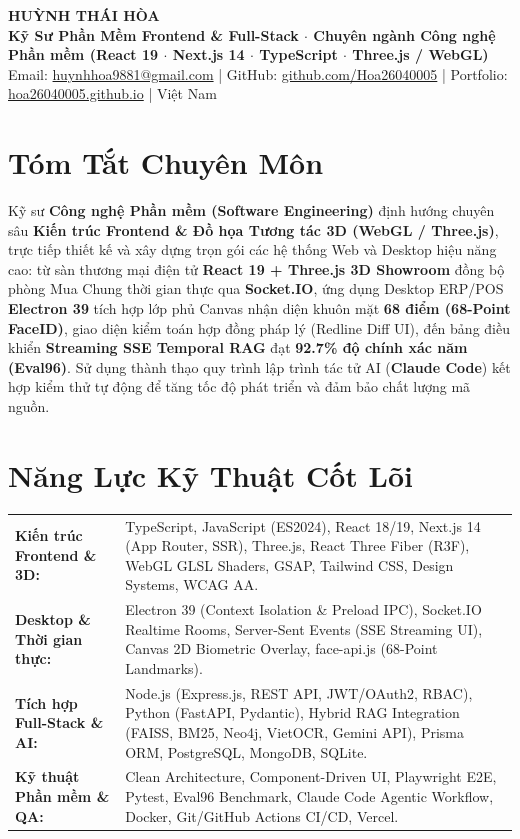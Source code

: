 \documentclass[10pt,a4paper]{article}
\begin{document}
\begin{center}
  {\Large \textbf{HUỲNH THÁI HÒA}} \\[2pt]
  {\small \textbf{Kỹ Sư Phần Mềm Frontend \& Full-Stack $\cdot$ Chuyên ngành Công nghệ Phần mềm (React 19 $\cdot$ Next.js 14 $\cdot$ TypeScript $\cdot$ Three.js / WebGL)}} \\[2pt]
  {\footnotesize
    Email: \href{mailto:huynhhoa9881@gmail.com}{huynhhoa9881@gmail.com} \quad|\quad
    GitHub: \href{https://github.com/Hoa26040005}{github.com/Hoa26040005} \quad|\quad
    Portfolio: \href{https://hoa26040005.github.io}{hoa26040005.github.io} \quad|\quad
    Việt Nam
  }
\end{center}

\section{Tóm Tắt Chuyên Môn}
{\footnotesize
Kỹ sư \textbf{Công nghệ Phần mềm (Software Engineering)} định hướng chuyên sâu \textbf{Kiến trúc Frontend \& Đồ họa Tương tác 3D (WebGL / Three.js)}, trực tiếp thiết kế và xây dựng trọn gói các hệ thống Web và Desktop hiệu năng cao: từ sàn thương mại điện tử \textbf{React 19 + Three.js 3D Showroom} đồng bộ phòng Mua Chung thời gian thực qua \textbf{Socket.IO}, ứng dụng Desktop ERP/POS \textbf{Electron 39} tích hợp lớp phủ Canvas nhận diện khuôn mặt \textbf{68 điểm (68-Point FaceID)}, giao diện kiểm toán hợp đồng pháp lý (Redline Diff UI), đến bảng điều khiển \textbf{Streaming SSE Temporal RAG} đạt \textbf{92.7\% độ chính xác năm (Eval96)}. Sử dụng thành thạo quy trình lập trình tác tử AI (\textbf{Claude Code}) kết hợp kiểm thử tự động để tăng tốc độ phát triển và đảm bảo chất lượng mã nguồn.
}

\section{Năng Lực Kỹ Thuật Cốt Lõi}
{\footnotesize
\renewcommand{\arraystretch}{1.12}
\begin{tabularx}{\textwidth}{@{}p{4.3cm}X@{}}
  \textbf{Kiến trúc Frontend \& 3D:} & TypeScript, JavaScript (ES2024), React 18/19, Next.js 14 (App Router, SSR), Three.js, React Three Fiber (R3F), WebGL GLSL Shaders, GSAP, Tailwind CSS, Design Systems, WCAG AA. \\
  \textbf{Desktop \& Thời gian thực:} & Electron 39 (Context Isolation \& Preload IPC), Socket.IO Realtime Rooms, Server-Sent Events (SSE Streaming UI), Canvas 2D Biometric Overlay, face-api.js (68-Point Landmarks). \\
  \textbf{Tích hợp Full-Stack \& AI:} & Node.js (Express.js, REST API, JWT/OAuth2, RBAC), Python (FastAPI, Pydantic), Hybrid RAG Integration (FAISS, BM25, Neo4j, VietOCR, Gemini API), Prisma ORM, PostgreSQL, MongoDB, SQLite. \\
  \textbf{Kỹ thuật Phần mềm \& QA:} & Clean Architecture, Component-Driven UI, Playwright E2E, Pytest, Eval96 Benchmark, Claude Code Agentic Workflow, Docker, Git/GitHub Actions CI/CD, Vercel.
\end{tabularx}
}
\end{document}
